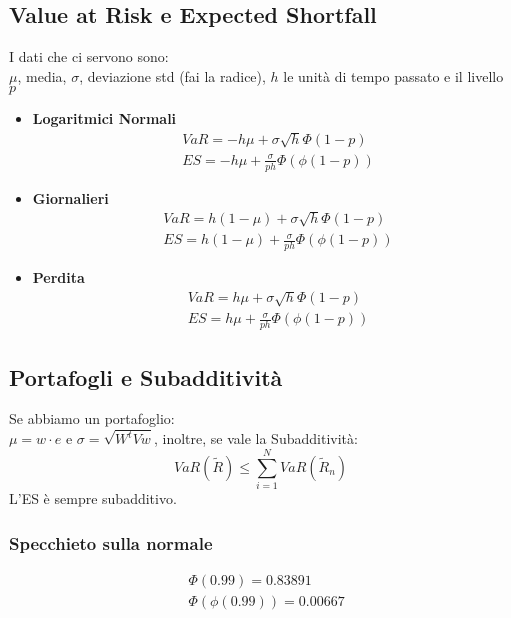 \documentclass[a4paper,notitlepage]{report}%
\begin{document}
\begin{multicols*}{2}
\section*{Value at Risk e Expected Shortfall}
    I dati che ci servono sono: \\
    $\mu$, media, $\sigma$, deviazione std (fai la radice),
    $h$ le unità di tempo passato e il livello $p$
    \begin{itemize}
        \item \textbf{Logaritmici Normali} 
            \begin{align*}
                &VaR = -h\mu+\sigma\sqrt{h}\Phi(1-p) \\
                &ES = -h\mu+\frac{\sigma}{ph} \Phi(\phi(1-p))
            \end{align*}
        \item \textbf{Giornalieri}
            \begin{align*}
                &VaR = h(1-\mu)+\sigma\sqrt{h}\Phi(1-p) \\
                &ES = h(1-\mu)+\frac{\sigma}{ph} \Phi(\phi(1-p))
            \end{align*}
        \item \textbf{Perdita}
            \begin{align*}
                &VaR = h\mu+\sigma\sqrt{h}\Phi(1-p) \\
                &ES = h\mu+\frac{\sigma}{ph} \Phi(\phi(1-p))
            \end{align*}
    \end{itemize}

    \subsection*{Portafogli e Subadditività}
    Se abbiamo un portafoglio:\\
    $\mu = w\cdot e$ e $\sigma = \sqrt{W^tVw}$, inoltre, se vale
    la Subadditività:
    \[
        VaR(\tilde{R}) \leq \sum_{i=1}^N VaR(\tilde{R}_n)  
    \]
    L'ES è sempre subadditivo.

    \subsubsection*{Specchieto sulla normale}
    \begin{align*}
        & \Phi(0.99) = 0.83891\\
        & \Phi(\phi(0.99)) = 0.00667
    \end{align*}

    
\end{multicols*}
\end{document}
